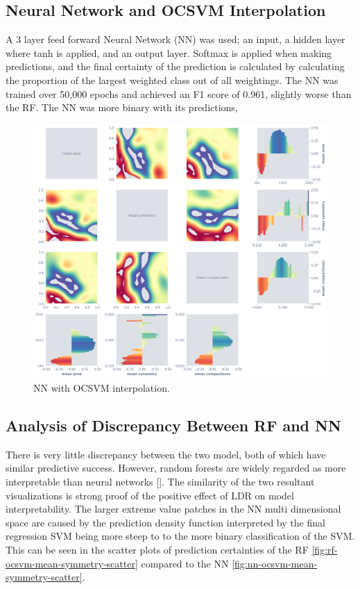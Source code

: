 \documentclass[a4paperpaper,twocolumn]{article}
\begin{document}
\subsection{Neural Network and OCSVM Interpolation}

A 3 layer feed forward Neural Network (NN) was used; an input, a hidden layer where tanh is applied, and an output layer. Softmax is applied when making predictions, and the final certainty of the prediction is calculated by calculating the proportion of the largest weighted class out of all weightings. The NN was trained over 50,000 epochs and achieved an F1 score of 0.961, slightly worse than the RF. The NN was more binary with its predictions, 

\begin{figure}
\centering
\includegraphics[width=\columnwidth]{img/nn_ocsvm_matrix.png}
\caption{NN with OCSVM interpolation.}
\label{fig:rf-ocsvm-matrix}
\end{figure}

\subsection{Analysis of Discrepancy Between RF and NN}

There is very little discrepancy between the two model, both of which have similar predictive success. However, random forests are widely regarded as more interpretable than neural networks []. The similarity of the two resultant visualizations is strong proof of the positive effect of LDR on model interpretability. The larger extreme value patches in the NN multi dimensional space are caused by the prediction density function interpreted by the final regression SVM being more steep to to the more binary classification of the SVM. This can be seen in the scatter plots of prediction certainties of the RF \ref{fig:rf-ocsvm-mean-symmetry-scatter} compared to the NN \ref{fig:nn-ocsvm-mean-symmetry-scatter}.
\end{document}
